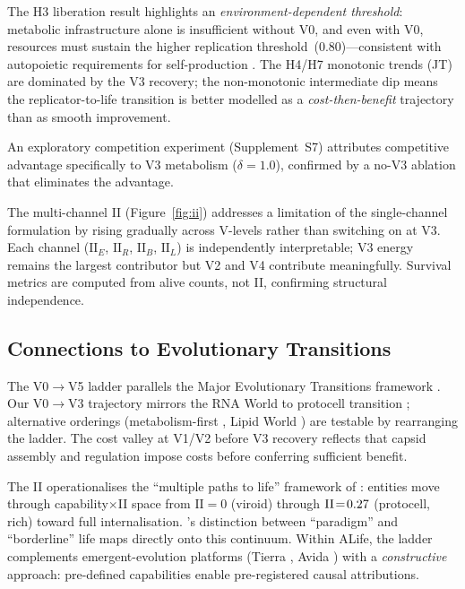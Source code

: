\documentclass[letterpaper]{article}
\begin{document}
The H3 liberation result highlights an \emph{environment-dependent threshold}:
metabolic infrastructure alone is insufficient without V0, and even with V0,
resources must sustain the higher replication threshold~(0.80)---consistent
with autopoietic requirements for self-production \citep{maturana_1980_autopoiesis}.
The H4/H7 monotonic trends (JT) are dominated by the V3 recovery; the
non-monotonic intermediate dip means the replicator-to-life transition is better
modelled as a \emph{cost-then-benefit} trajectory than as smooth improvement.

An exploratory competition experiment (Supplement~S7) attributes competitive
advantage specifically to V3 metabolism ($\delta\!=\!1.0$), confirmed by a
no-V3 ablation that eliminates the advantage.

The multi-channel II (Figure~\ref{fig:ii}) addresses a limitation of the
single-channel formulation by rising gradually across V-levels rather than
switching on at V3.
Each channel ($\mathrm{II}_E$, $\mathrm{II}_R$, $\mathrm{II}_B$,
$\mathrm{II}_L$) is independently interpretable; V3 energy remains the
largest contributor but V2 and V4 contribute meaningfully.
Survival metrics are computed from alive counts, not II, confirming
structural independence.

\subsection{Connections to Evolutionary Transitions}

The V0$\to$V5 ladder parallels the Major Evolutionary Transitions framework
\citep{szathmary_1995_major}.
Our V0$\to$V3 trajectory mirrors the RNA World to protocell transition
\citep{gilbert_1986_origin}; alternative orderings (metabolism-first
\citep{martin_2007_energetics}, Lipid World \citep{segre_2001_lipid}) are
testable by rearranging the ladder.
The cost valley at V1/V2 before V3 recovery reflects that capsid assembly
and regulation impose costs before conferring sufficient benefit.

The II operationalises the ``multiple paths to life'' framework of
\citet{kempes_2021_multiple}: entities move through capability$\times$II
space from $\mathrm{II}\!=\!0$ (viroid) through
$\mathrm{II}\!=\!0.27{}$ (protocell, rich) toward
full internalisation.
\citet{godfreysmith_2014_philosophy}'s distinction between ``paradigm'' and
``borderline'' life maps directly onto this continuum.
Within ALife, the ladder complements emergent-evolution platforms
(Tierra \citep{ray_1991_approach}, Avida \citep{ofria_2004_avida}) with a
\emph{constructive} approach: pre-defined capabilities enable pre-registered
causal attributions.
\end{document}
